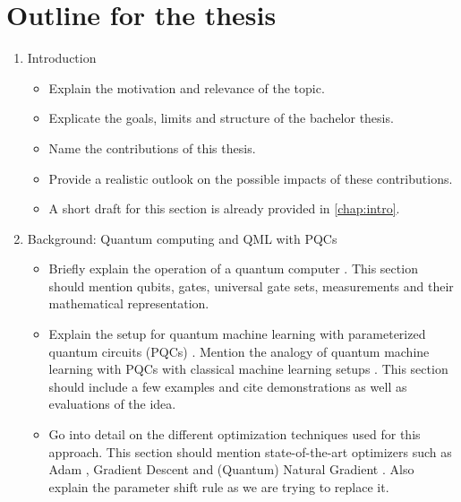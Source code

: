 \chapter{Outline for the thesis}
\label{chap:outline}

\begin{enumerate}
    \item Introduction
    \begin{itemize}
        \item
            Explain the motivation and relevance of the topic.
        \item
            Explicate the goals, limits and structure of the bachelor thesis.
        \item
            Name the contributions of this thesis.
        \item
            Provide a realistic outlook on the possible impacts of these
            contributions.
        \item
            A short draft for this section is already provided in
            \autoref{chap:intro}.
    \end{itemize}

    \item Background: Quantum computing and QML with PQCs
    \begin{itemize}
        \item
            Briefly explain the operation of a quantum computer
            \cite{nielsen_quantum_2007}.
            This section should mention qubits, gates, universal gate sets,
            measurements and their mathematical representation.
        \item
            Explain the setup for quantum machine learning with parameterized
            quantum circuits (PQCs) \cite{mitarai_quantum_2018}.
            Mention the analogy of quantum machine learning with PQCs with
            classical machine learning setups \cite{bishop_pattern_2006}.
            This section should include a few examples and cite demonstrations
            as well as evaluations of the idea.
        \item
            Go into detail on the different optimization techniques used for
            this approach.
            This section should mention state-of-the-art optimizers such as
            Adam \cite{kingma_adam_2017}, Gradient Descent and
            (Quantum) Natural Gradient \cite{stokes_quantum_2020}.
            Also explain the parameter shift rule
            \cite{mitarai_quantum_2018,schuld_evaluating_2019} as we are trying
            to replace it.
    \end{itemize}


\end{enumerate}
